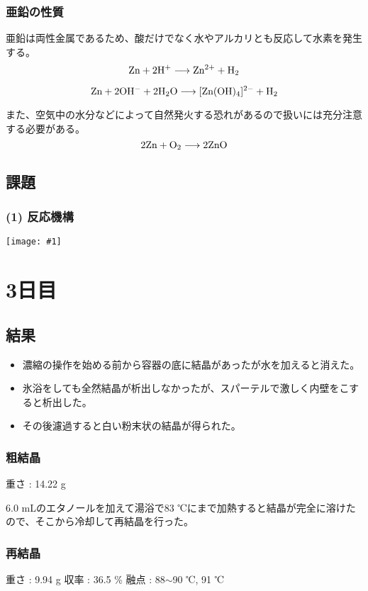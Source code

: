 \documentclass[a4paper,papersize,dvipdfmx]{jsarticle}
\newcommand{\pic}[1]{\begin{center} \texttt{[image: \#1]} \end{center}}   %
\begin{document}
\subsubsection*{亜鉛の性質}
亜鉛は両性金属であるため、酸だけでなく水やアルカリとも反応して水素を発生する。
\[\rm Zn + 2 H^+ \longrightarrow Zn^{2+} + H_2\]

\[\rm Zn + 2OH^-+ 2H_2O \longrightarrow [Zn(OH)_4]^{2-} + H_2\]

また、空気中の水分などによって自然発火する恐れがあるので扱いには充分注意する必要がある。
\[ \rm 2 Zn + O_2 \longrightarrow 2ZnO\]

\subsection*{課題}

\subsubsection*{(1) 反応機構}
\pic{imgs2/hk.jpg}



\section*{3日目}

\subsection*{結果}
\begin{itemize}
\item 濃縮の操作を始める前から容器の底に結晶があったが水を加えると消えた。
\item 氷浴をしても全然結晶が析出しなかったが、スパーテルで激しく内壁をこすると析出した。
\item その後濾過すると白い粉末状の結晶が得られた。

\end{itemize}
\subsubsection*{粗結晶}
重さ : 14.22 g

6.0 mLのエタノールを加えて湯浴で83 ℃にまで加熱すると結晶が完全に溶けたので、そこから冷却して再結晶を行った。

\subsubsection*{再結晶}
重さ : 9.94 g
収率 : 36.5 \%
融点 : 88$\sim$90 ℃, 91 ℃
\end{document}
